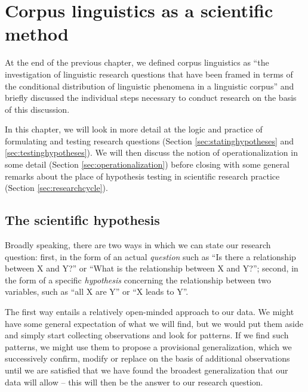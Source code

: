 \chapter{Corpus linguistics as a scientific method}
\label{ch:scientificmethod}

At the end of the previous chapter, we defined corpus linguistics as ``the investigation of linguistic research questions that have been framed in terms of the conditional distribution of linguistic phenomena in a linguistic corpus'' and briefly discussed the individual steps necessary to conduct research on the basis of this discussion. 

In this chapter, we will look in more detail at the logic and practice of formulating and testing research questions (Section \ref{sec:statinghypotheses} and \ref{sec:testinghypotheses}). We will then discuss the notion of operationalization in some detail (Section \ref{sec:operationalization}) before closing with some general remarks about the place of hypothesis testing in scientific research practice (Section \ref{sec:researchcycle}).

\section{The scientific hypothesis}
\label{sec:scientifichypothesis}

Broadly speaking, there are two ways in which we can state our research question: first, in the form of an actual \emph{question} such as ``Is there a relationship between X and Y?'' or ``What is the relationship between X and Y?''; second, in the form of a specific \emph{hypothesis} concerning the relationship between two variables, such as ``all X are Y'' or ``X leads to Y''.

The first way entails a relatively open-minded approach to our data. We might have some general expectation of what we will find, but we would put them aside and simply start collecting observations and look for patterns. If we find such patterns, we might use them to propose a provisional generalization, which we successively confirm, modify or replace on the basis of additional observations until we are satisfied that we have found the broadest generalization that our data will allow -- this will then be the answer to our research question.

